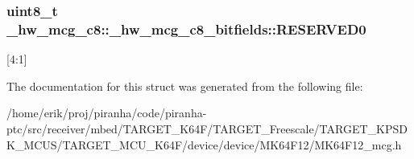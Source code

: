 \subsubsection[{\texorpdfstring{R\+E\+S\+E\+R\+V\+E\+D0}{RESERVED0}}]{\setlength{\rightskip}{0pt plus 5cm}uint8\+\_\+t \+\_\+hw\+\_\+mcg\+\_\+c8\+::\+\_\+hw\+\_\+mcg\+\_\+c8\+\_\+bitfields\+::\+R\+E\+S\+E\+R\+V\+E\+D0}\hypertarget{struct__hw__mcg__c8_1_1__hw__mcg__c8__bitfields_a0eafe2cf15afaf73c05251d50ac13985}{}\label{struct__hw__mcg__c8_1_1__hw__mcg__c8__bitfields_a0eafe2cf15afaf73c05251d50ac13985}
\mbox{[}4\+:1\mbox{]} 

The documentation for this struct was generated from the following file\+:\begin{DoxyCompactItemize}
\item 
/home/erik/proj/piranha/code/piranha-\/ptc/src/receiver/mbed/\+T\+A\+R\+G\+E\+T\+\_\+\+K64\+F/\+T\+A\+R\+G\+E\+T\+\_\+\+Freescale/\+T\+A\+R\+G\+E\+T\+\_\+\+K\+P\+S\+D\+K\+\_\+\+M\+C\+U\+S/\+T\+A\+R\+G\+E\+T\+\_\+\+M\+C\+U\+\_\+\+K64\+F/device/device/\+M\+K64\+F12/M\+K64\+F12\+\_\+mcg.\+h\end{DoxyCompactItemize}
